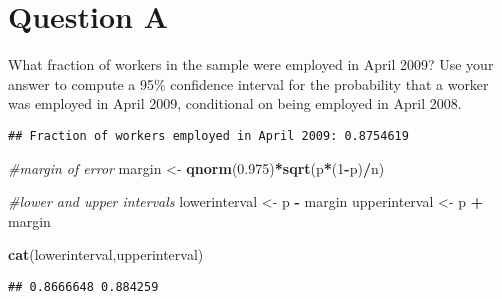 \documentclass[
]{article}
\newenvironment{Shaded}{\begin{snugshade}}{\end{snugshade}}
\newcommand{\CommentTok}[1]{\textcolor[rgb]{0.56,0.35,0.01}{\textit{#1}}}
\newcommand{\DecValTok}[1]{\textcolor[rgb]{0.00,0.00,0.81}{#1}}
\newcommand{\FloatTok}[1]{\textcolor[rgb]{0.00,0.00,0.81}{#1}}
\newcommand{\FunctionTok}[1]{\textcolor[rgb]{0.13,0.29,0.53}{\textbf{#1}}}
\newcommand{\NormalTok}[1]{#1}
\newcommand{\OtherTok}[1]{\textcolor[rgb]{0.56,0.35,0.01}{#1}}
\newcommand{\SpecialCharTok}[1]{\textcolor[rgb]{0.81,0.36,0.00}{\textbf{#1}}}
\newcommand{\StringTok}[1]{\textcolor[rgb]{0.31,0.60,0.02}{#1}}
\begin{document}
\hypertarget{question-a}{%
\section{Question A}\label{question-a}}

What fraction of workers in the sample were employed in April 2009? Use
your answer to compute a 95\% confidence interval for the probability
that a worker was employed in April 2009, conditional on being employed
in April 2008.

\begin{Shaded}
\end{Shaded}

\begin{verbatim}
## Fraction of workers employed in April 2009: 0.8754619
\end{verbatim}

\begin{Shaded}
\begin{Highlighting}[]
\CommentTok{\#margin of error}
\NormalTok{margin }\OtherTok{\textless{}{-}} \FunctionTok{qnorm}\NormalTok{(}\FloatTok{0.975}\NormalTok{)}\SpecialCharTok{*}\FunctionTok{sqrt}\NormalTok{(p}\SpecialCharTok{*}\NormalTok{(}\DecValTok{1}\SpecialCharTok{{-}}\NormalTok{p)}\SpecialCharTok{/}\NormalTok{n)}

\CommentTok{\#lower and upper intervals}
\NormalTok{lowerinterval }\OtherTok{\textless{}{-}}\NormalTok{ p }\SpecialCharTok{{-}}\NormalTok{ margin}
\NormalTok{upperinterval }\OtherTok{\textless{}{-}}\NormalTok{ p }\SpecialCharTok{+}\NormalTok{ margin}

\FunctionTok{cat}\NormalTok{(lowerinterval,upperinterval)}
\end{Highlighting}
\end{Shaded}

\begin{verbatim}
## 0.8666648 0.884259
\end{verbatim}
\end{document}
